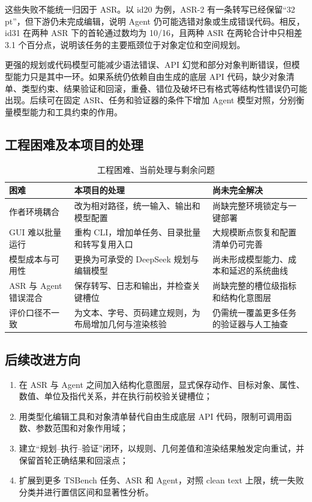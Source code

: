 \documentclass[11pt,a4paper,UTF8,fontset=fandol]{ctexart}
\begin{document}
这些失败不能统一归因于 ASR。以 id20 为例，ASR-2 有一条转写已经保留“32 pt”，但下游仍未完成编辑，说明 Agent 仍可能选错对象或生成错误代码。相反，id31 在两种 ASR 下的首轮通过数均为 10/16，且两种 ASR 在两轮合计中只相差 3.1 个百分点，说明该任务的主要瓶颈位于对象定位和空间规划。

更强的规划或代码模型可能减少语法错误、API 幻觉和部分对象判断错误，但模型能力只是其中一环。如果系统仍依赖自由生成的底层 API 代码，缺少对象清单、类型约束、结果验证和回滚，重叠、错位及破坏已有格式等结构性错误仍可能出现。后续可在固定 ASR、任务和验证器的条件下增加 Agent 模型对照，分别衡量模型能力和工具约束的作用。

\subsection{工程困难及本项目的处理}

\begin{table}[H]
\centering
\caption{工程困难、当前处理与剩余问题}
\small
\begin{tabularx}{\textwidth}{L{3.0cm} Y Y}
\toprule
困难 & 本项目的处理 & 尚未完全解决 \\
\midrule
作者环境耦合 & 改为相对路径，统一输入、输出和模型配置 & 尚缺完整环境锁定与一键部署 \\
GUI 难以批量运行 & 重构 CLI，增加单任务、目录批量和转写复用入口 & 大规模断点恢复和配置清单仍可完善 \\
模型成本与可用性 & 更换为可承受的 DeepSeek 规划与编辑模型 & 尚未形成模型能力、成本和延迟的系统曲线 \\
ASR 与 Agent 错误混合 & 保存转写、日志和输出，并检查关键槽位 & 尚缺完整的槽位级指标和结构化意图层 \\
评价口径不一致 & 为文本、字号、页码建立规则，为布局增加几何与渲染核验 & 仍需统一覆盖更多任务的验证器与人工抽查 \\
\bottomrule
\end{tabularx}
\end{table}

\subsection{后续改进方向}

\begin{enumerate}
  \item 在 ASR 与 Agent 之间加入结构化意图层，显式保存动作、目标对象、属性、数值、单位及指代关系，并在执行前校验关键槽位；
  \item 用类型化编辑工具和对象清单替代自由生成底层 API 代码，限制可调用函数、参数范围和对象作用域；
  \item 建立“规划--执行--验证”闭环，以规则、几何差值和渲染结果触发定向重试，并保留首轮正确结果和回滚点；
  \item 扩展到更多 TSBench 任务、ASR 和 Agent，对照 clean text 上限，统一失败分类并进行置信区间和显著性分析。
\end{enumerate}
\end{document}
